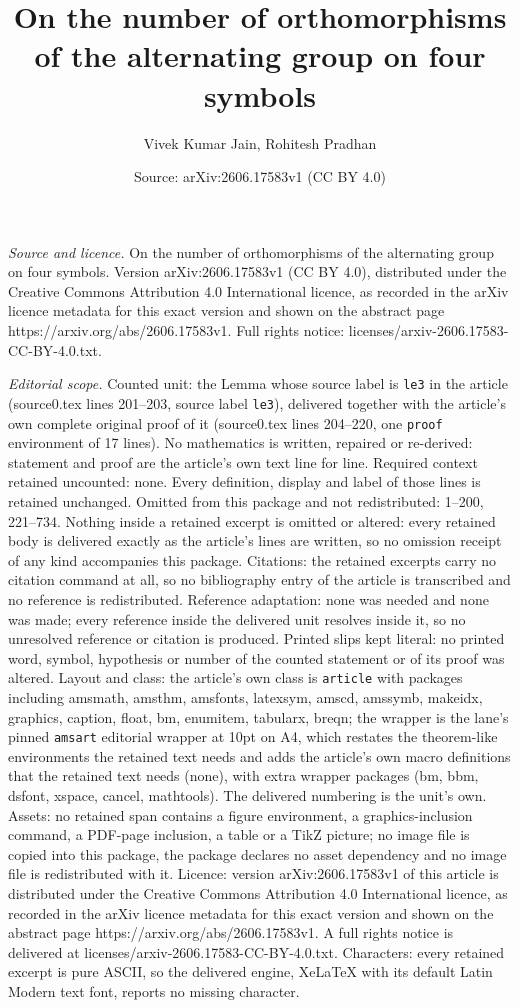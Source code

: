 \documentclass[10pt,a4paper]{amsart}
\title[On the number of orthomorphisms of the alternating group on ]{On the number of orthomorphisms of the alternating group on four symbols}
\author{Vivek Kumar Jain, Rohitesh Pradhan}
\date{Source: arXiv:2606.17583v1 (CC BY 4.0)}
\begin{document}
\maketitle

\noindent\emph{Source and licence.} On the number of orthomorphisms of the alternating group on four symbols. Version arXiv:2606.17583v1 (CC BY 4.0), distributed under the Creative Commons Attribution 4.0 International licence, as recorded in the arXiv licence metadata for this exact version and shown on the abstract page https://arxiv.org/abs/2606.17583v1. Full rights notice: licenses/arxiv-2606.17583-CC-BY-4.0.txt.\par\smallskip

\noindent\textit{Editorial scope.} Counted unit: the Lemma whose source label is \texttt{le3} in the article (source0.tex lines 201--203, source label \texttt{le3}), delivered together with the article's own complete original proof of it (source0.tex lines 204--220, one \texttt{proof} environment of 17 lines). No mathematics is written, repaired or re-derived: statement and proof are the article's own text line for line. Required context retained uncounted: none. Every definition, display and label of those lines is retained unchanged. Omitted from this package and not redistributed: 1--200, 221--734. Nothing inside a retained excerpt is omitted or altered: every retained body is delivered exactly as the article's lines are written, so no omission receipt of any kind accompanies this package. Citations: the retained excerpts carry no citation command at all, so no bibliography entry of the article is transcribed and no reference is redistributed. Reference adaptation: none was needed and none was made; every reference inside the delivered unit resolves inside it, so no unresolved reference or citation is produced. Printed slips kept literal: no printed word, symbol, hypothesis or number of the counted statement or of its proof was altered. Layout and class: the article's own class is \texttt{article} with packages including amsmath, amsthm, amsfonts, latexsym, amscd, amssymb, makeidx, graphics, caption, float, bm, enumitem, tabularx, breqn; the wrapper is the lane's pinned \texttt{amsart} editorial wrapper at 10pt on A4, which restates the theorem-like environments the retained text needs and adds the article's own macro definitions that the retained text needs (none), with extra wrapper packages (bm, bbm, dsfont, xspace, cancel, mathtools). The delivered numbering is the unit's own. Assets: no retained span contains a figure environment, a graphics-inclusion command, a PDF-page inclusion, a table or a TikZ picture; no image file is copied into this package, the package declares no asset dependency and no image file is redistributed with it. Licence: version arXiv:2606.17583v1 of this article is distributed under the Creative Commons Attribution 4.0 International licence, as recorded in the arXiv licence metadata for this exact version and shown on the abstract page https://arxiv.org/abs/2606.17583v1. A full rights notice is delivered at licenses/arxiv-2606.17583-CC-BY-4.0.txt. Characters: every retained excerpt is pure ASCII, so the delivered engine, XeLaTeX with its default Latin Modern text font, reports no missing character.
\end{document}
